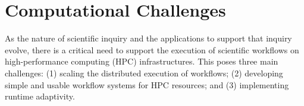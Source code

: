 \documentclass[conference]{IEEEtran}
\begin{document}



\section{Computational Challenges}\label{sec:cc}



As the nature of scientific inquiry and the applications to support that
inquiry evolve, there is a critical need to support the execution of
scientific workflows on high-performance computing (HPC) infrastructures.
This poses three main challenges: (1) scaling the distributed execution of
workflows; (2) developing simple and usable workflow systems for HPC
resources; and (3) implementing runtime adaptivity.
\end{document}
